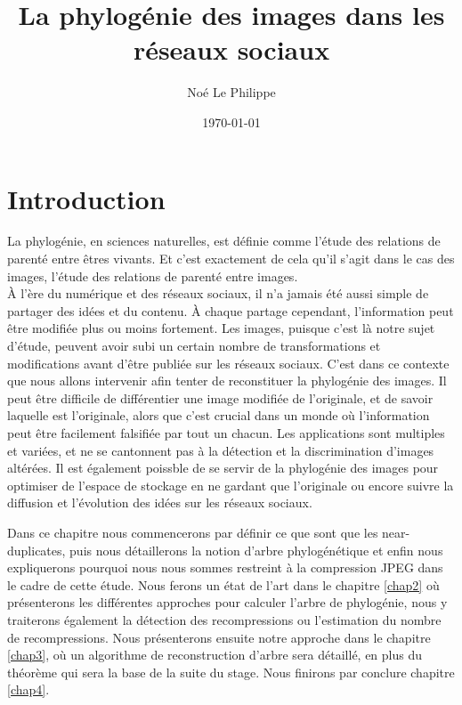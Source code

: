 \documentclass[utf8]{stageM2R} %
\author{Noé Le Philippe}
\title{La phylogénie des images dans les réseaux sociaux}
\date{\today}
\begin{document}
   
\frontmatter  %
\maketitle    %
\cleardoublepage   
\tableofcontents %
\mainmatter  %



\chapter{Introduction}
La phylogénie, en sciences naturelles, est définie comme l'étude des relations de parenté entre êtres vivants. Et c'est exactement de cela qu'il s'agit dans le cas des images, l'étude des relations de parenté entre images. \cite{phylogeny} \\
À l'ère du numérique et des réseaux sociaux, il n'a jamais été aussi simple de partager des idées et du contenu. À chaque partage cependant, l'information peut être modifiée plus ou moins fortement. Les images, puisque c'est là notre sujet d'étude, peuvent avoir subi un certain nombre de transformations et modifications avant d'être publiée sur les réseaux sociaux. C'est dans ce contexte que nous allons intervenir afin tenter de reconstituer la phylogénie des images. Il peut être difficile de différentier une image modifiée de l'originale, et de savoir laquelle est l'originale, alors que c'est crucial dans un monde où l'information peut être facilement falsifiée par tout un chacun. Les applications sont multiples et variées, et ne se cantonnent pas à la détection et la discrimination d'images altérées. Il est également poissble de se servir de la phylogénie des images pour optimiser de l'espace de stockage en ne gardant que l'originale ou encore suivre la diffusion et l'évolution des idées sur les réseaux sociaux. 

Dans ce chapitre nous commencerons par définir ce que sont que les near-duplicates, puis nous détaillerons la notion d'arbre phylogénétique et enfin nous expliquerons pourquoi nous nous sommes restreint à la compression JPEG dans le cadre de cette étude. Nous ferons un état de l'art dans le chapitre \ref{chap2} où présenterons les différentes approches pour calculer l'arbre de phylogénie, nous y traiterons également la détection des recompressions ou l'estimation du nombre de recompressions. Nous présenterons ensuite notre approche dans le chapitre \ref{chap3}, où un algorithme de reconstruction d'arbre sera détaillé, en plus du théorème qui sera la base de la suite du stage. Nous finirons par conclure chapitre \ref{chap4}.
\newpage
\end{document}
